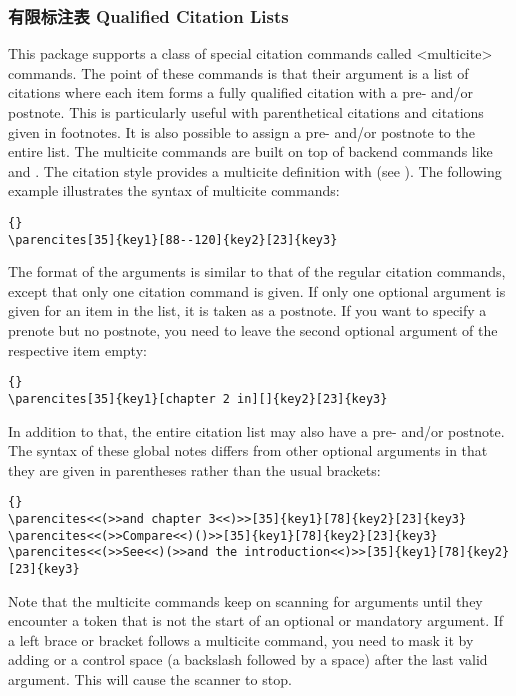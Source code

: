 \subsubsection{有限标注表 Qualified Citation Lists}
\label{use:cit:mlt}

This package supports a class of special citation commands called <multicite> commands. The point of these commands is that their argument is a list of citations where each item forms a fully qualified citation with a pre- and\slash or postnote. This is particularly useful with parenthetical citations and citations given in footnotes. It is also possible to assign a pre- and\slash or postnote to the entire list. The multicite commands are built on top of backend commands like  and . The citation style provides a multicite definition with  (see ). The following example illustrates the syntax of multicite commands:

\begin{lstlisting}[style=latex]{}
\parencites[35]{key1}[88--120]{key2}[23]{key3}
\end{lstlisting}
%
The format of the arguments is similar to that of the regular citation commands, except that only one citation command is given. If only one optional argument is given for an item in the list, it is taken as a postnote. If you want to specify a prenote but no postnote, you need to leave the second optional argument of the respective item empty:

\begin{lstlisting}[style=latex]{}
\parencites[35]{key1}[chapter 2 in][]{key2}[23]{key3}
\end{lstlisting}
%
In addition to that, the entire citation list may also have a pre- and\slash or postnote. The syntax of these global notes differs from other optional arguments in that they are given in parentheses rather than the usual brackets:

\begin{lstlisting}[style=latex]{}
\parencites<<(>>and chapter 3<<)>>[35]{key1}[78]{key2}[23]{key3}
\parencites<<(>>Compare<<)()>>[35]{key1}[78]{key2}[23]{key3}
\parencites<<(>>See<<)(>>and the introduction<<)>>[35]{key1}[78]{key2}[23]{key3}
\end{lstlisting}
%
Note that the multicite commands keep on scanning for arguments until they encounter a token that is not the start of an optional or mandatory argument. If a left brace or bracket follows a multicite command, you need to mask it by adding  or a control space (a backslash followed by a space) after the last valid argument. This will cause the scanner to stop.

